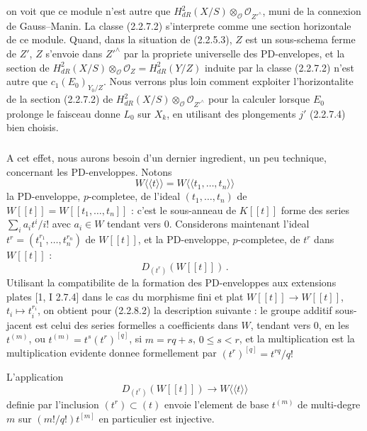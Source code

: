 \documentclass[12pt,a4paper]{article}
\theoremstyle{plain}
\theoremstyle{definition}
\theoremstyle{remark}
\begin{document}
on voit que ce module n'est autre que $H_{dR}^2(X/S) \otimes_\mathcal{O} \mathcal{O}_{Z'^\wedge}$, muni de la connexion de Gauss--Manin. La classe (2.2.7.2) s'interprete comme une section horizontale de ce module. Quand, dans la situation de (2.2.5.3), $Z$ est un sous-schema ferme de $Z'$, $Z$ s'envoie dans $Z'^\wedge$ par la propriete universelle des PD-envelopes, et la section de $H_{dR}^2(X/S) \otimes_\mathcal{O} \mathcal{O}_Z = H_{dR}^2(Y/Z)$ induite par la classe (2.2.7.2) n'est autre que $c_1(E_0)_{Y_0/Z}$. Nous verrons plus loin comment exploiter l'horizontalite de la section (2.2.7.2) de $H_{dR}^2(X/S) \otimes_\mathcal{O} \mathcal{O}_{Z'^\wedge}$ pour la calculer lorsque $E_0$ prolonge le faisceau donne $L_0$ sur $X_k$, en utilisant des plongements $j'$ (2.2.7.4) bien choisis.

\subsubsection{}

A cet effet, nous aurons besoin d'un dernier ingredient, un peu technique, concernant les PD-enveloppes. Notons
\begin{equation}\label{eq:2.2.8.1}
W\langle\langle t \rangle\rangle = W\langle\langle t_1, \ldots, t_n \rangle\rangle
\end{equation}
la PD-enveloppe, $p$-completee, de l'ideal $(t_1, \ldots, t_n)$ de $W[[t]] = W[[t_1, \ldots, t_n]]$ : c'est le sous-anneau de $K[[t]]$ forme des series $\sum_i a_i t^i/i!$ avec $a_i \in W$ tendant vers 0. Considerons maintenant l'ideal $t^r = (t_1^{r_1}, \ldots, t_n^{r_n})$ de $W[[t]]$, et la PD-enveloppe, $p$-completee, de $t^r$ dans $W[[t]]$ :
\begin{equation}\label{eq:2.2.8.2}
D_{(t^r)}(W[[t]])\,.\end{equation}
Utilisant la compatibilite de la formation des PD-enveloppes aux extensions plates [1, I 2.7.4] dans le cas du morphisme fini et plat $W[[t]] \to W[[t]]$, $t_i \mapsto t_i^{r_i}$, on obtient pour (2.2.8.2) la description suivante : le groupe additif sous-jacent est celui des series formelles a coefficients dans $W$, tendant vers 0, en les $t^{(m)}$, ou $t^{(m)} = t^s(t^r)^{[q]}$, si $m = rq + s$, $0 \leq s < r$, et la multiplication est la multiplication evidente donnee formellement par $(t^r)^{[q]} = t^{rq}/q!$

L'application
\begin{equation}\label{eq:2.2.8.3}
D_{(t^r)}(W[[t]]) \longrightarrow W\langle\langle t \rangle\rangle
\end{equation}
definie par l'inclusion $(t^r) \subset (t)$ envoie l'element de base $t^{(m)}$ de multi-degre $m$ sur $(m!/q!)t^{[m]}$ en particulier est injective.
\end{document}
